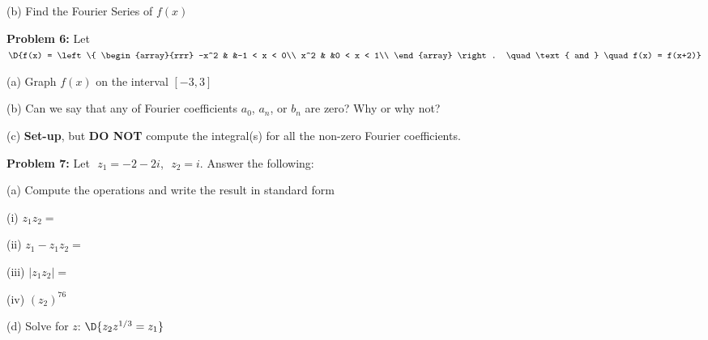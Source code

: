 \documentclass[12pt]{amsart}
\numberwithin{equation}{section}
\begin{document}
(b) Find the Fourier Series of $f(x)$

\thispagestyle{empty}
\newpage
\thispagestyle{empty}

{\bf Problem 6:} Let \quad 
$\D{f(x) = 
\left\{
\begin{array}{rrr}
	-x^2 & &-1  < x <   0\\
	x^2 & &0  < x <   1\\
\end{array}
\right.
\quad \text{ and } \quad f(x) = f(x+2)}$

\vspace{0.1cm}

(a) Graph $f(x)$ on the interval $[-3,3]$

\vspace{8.2cm}

(b) Can we say that any of Fourier coefficients $a_0$, $a_n$, or $b_n$ are zero? Why or why not?

\vspace{2.2cm}

(c) {\bf Set-up}, but {\bf DO NOT} compute the integral(s) for all the non-zero Fourier coefficients.

\thispagestyle{empty}
\newpage
\thispagestyle{empty}

{\bf Problem 7:} Let \,\,$z_1 = -2-2i$,\,\, $z_2 = i$. \quad Answer the following:

\vspace{0.2cm}

(a) Compute the operations and write the result in standard form 

\vspace{0.2cm}

\hspace{0.6cm} (i) $z_1z_2 = $

\vspace{2.8cm}

\hspace{0.6cm} (ii) $z_1-z_1z_2 = $

\vspace{3.8cm}

\hspace{0.6cm} (iii) $|z_1z_2| = $

\vspace{3.8cm}

\hspace{0.6cm} (iv) $(z_2)^{76}$

\vspace{3.8cm}

(d) Solve for $z$: \quad $\D{z_2z^{1/3} = z_1}$
\end{document}
